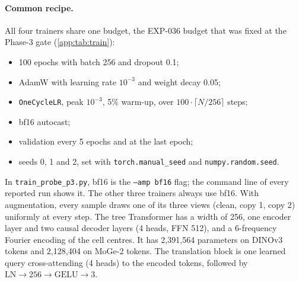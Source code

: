 \paragraph{Common recipe.}
All four trainers share one budget, the EXP-036 budget that was fixed at the Phase-3 gate (\cref{app:tab:train}):
\begin{itemize}
  \item 100 epochs with batch 256 and dropout 0.1;
  \item AdamW with learning rate $10^{-3}$ and weight decay 0.05;
  \item \texttt{OneCycleLR}, peak $10^{-3}$, 5\% warm-up, over $100\cdot\lceil N/256\rceil$ steps;
  \item bf16 autocast;
  \item validation every 5 epochs and at the last epoch;
  \item seeds 0, 1 and 2, set with \texttt{torch.manual\_seed} and \texttt{numpy.random.seed}.
\end{itemize}
In \texttt{train\_probe\_p3.py}, bf16 is the \texttt{--amp bf16} flag; the command line of every reported run shows it. The other three trainers always use bf16.
With augmentation, every sample draws one of its three views (clean, copy 1, copy 2) uniformly at every step.
The tree Transformer has a width of 256, one encoder layer and two causal decoder layers (4 heads, FFN 512), and a 6-frequency Fourier encoding of the cell centres. It has 2{,}391{,}564 parameters on DINOv3 tokens and 2{,}128{,}404 on MoGe-2 tokens.
The translation block is one learned query cross-attending (4 heads) to the encoded tokens, followed by $\text{LN}\to256\to\text{GELU}\to3$.

